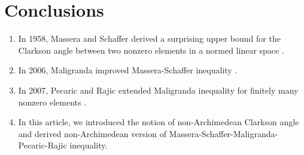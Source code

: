 \documentclass{amsart}
\begin{document}
\section{Conclusions}
\begin{enumerate}
	\item In 1958, Massera and Schaffer derived a surprising upper bound for the Clarkson angle between two nonzero elements in a normed linear space \cite{MASSERASCHAFFER}.
	\item In 2006, Maligranda improved Massera-Schaffer inequality \cite{MALIGRANDA}.
	\item In 2007, Pecaric and Rajic extended Maligranda inequality for finitely many nonzero elements \cite{PECARICRAJIC}. 
	\item In this article, we introduced the notion of non-Archimedean Clarkson angle and derived   non-Archimedean version of Massera-Schaffer-Maligranda-Pecaric-Rajic inequality. 
\end{enumerate}

 
 
 
\end{document}
